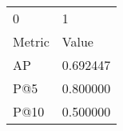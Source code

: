 \begin{tabular}{ll}
0 & 1 \\
Metric & Value \\
AP & 0.692447 \\
P@5 & 0.800000 \\
P@10 & 0.500000 \\
\end{tabular}
